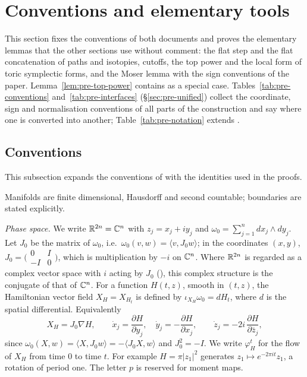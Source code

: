 \section{Conventions and elementary tools}\label{sec:pre}

This section fixes the conventions of both documents and proves the elementary lemmas that the
other sections use without comment: the flat step and the flat concatenation of paths and isotopies,
cutoffs, the top power and the local form of toric symplectic forms, and the Moser lemma with the sign
conventions of the paper. Lemma~\ref{lem:pre-top-power} contains  as a
special case. Tables~\ref{tab:pre-conventions} and~\ref{tab:pre-interfaces} (\S\ref{sec:pre-unified}) collect the
coordinate, sign and normalisation conventions of all parts of the construction and say where one is converted into
another; Table~\ref{tab:pre-notation} extends .

\subsection{Conventions}\label{sec:pre-conventions}

This subsection expands the conventions of  with the identities used in
the proofs.

Manifolds are finite dimensional, Hausdorff and second countable; boundaries are stated explicitly.

\emph{Phase space.} We write $\mathbb{R}^{2n}=\mathbb{C}^n$ with $z_j=x_j+iy_j$ and
$\omega_0=\sum_{j=1}^ndx_j\wedge dy_j$. Let $J_0$ be the matrix of $\omega_0$, i.e.\
$\omega_0(v,w)=\langle v,J_0w\rangle$; in the coordinates $(x,y)$, $J_0=\bigl(\begin{smallmatrix}0&I\\-I&0
\end{smallmatrix}\bigr)$, which is multiplication by $-i$ on $\mathbb{C}^n$. Where $\mathbb{R}^{2n}$ is regarded as a
complex vector space with $i$ acting by $J_0$ (\Msec{sec:ham}), this complex structure is the conjugate of
that of $\mathbb{C}^n$. For a function $H(t,z)$, smooth in $(t,z)$, the Hamiltonian vector field $X_H=X_{H_t}$ is
defined by $\iota_{X_H}\omega_0=dH_t$, where $d$ is the spatial differential. Equivalently
\[
 X_H=J_0\nabla H,\qquad \dot x_j=\frac{\partial H}{\partial y_j},\quad \dot y_j=-\frac{\partial H}{\partial x_j},
 \qquad \dot z_j=-2i\,\frac{\partial H}{\partial\bar z_j},
\]
since $\omega_0(X,w)=\langle X,J_0w\rangle=-\langle J_0X,w\rangle$ and $J_0^2=-I$. We write $\varphi^t_H$ for the
flow of $X_H$ from time $0$ to time $t$. For example $H=\pi|z_1|^2$ generates
$z_1\mapsto e^{-2\pi it}z_1$, a rotation of period one. The letter $p$ is reserved for moment maps.

